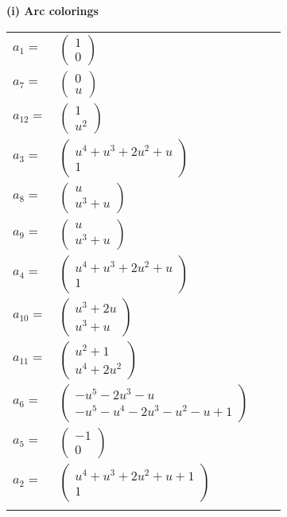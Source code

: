 \documentclass[1p]{elsarticle_modified}
\theoremstyle{definition}
\begin{document}
\flushleft \textbf{(i) Arc colorings}\\
\begin{tabular}{m{7pt} m{180pt} m{7pt} m{180pt} }
\flushright $a_{1}=$&$\begin{pmatrix}1\\0\end{pmatrix}$ \\
\flushright $a_{7}=$&$\begin{pmatrix}0\\u\end{pmatrix}$ \\
\flushright $a_{12}=$&$\begin{pmatrix}1\\u^2\end{pmatrix}$ \\
\flushright $a_{3}=$&$\begin{pmatrix}u^4+u^3+2 u^2+u\\1\end{pmatrix}$ \\
\flushright $a_{8}=$&$\begin{pmatrix}u\\u^3+u\end{pmatrix}$ \\
\flushright $a_{9}=$&$\begin{pmatrix}u\\u^3+u\end{pmatrix}$ \\
\flushright $a_{4}=$&$\begin{pmatrix}u^4+u^3+2 u^2+u\\1\end{pmatrix}$ \\
\flushright $a_{10}=$&$\begin{pmatrix}u^3+2 u\\u^3+u\end{pmatrix}$ \\
\flushright $a_{11}=$&$\begin{pmatrix}u^2+1\\u^4+2 u^2\end{pmatrix}$ \\
\flushright $a_{6}=$&$\begin{pmatrix}- u^5-2 u^3- u\\- u^5- u^4-2 u^3- u^2- u+1\end{pmatrix}$ \\
\flushright $a_{5}=$&$\begin{pmatrix}-1\\0\end{pmatrix}$ \\
\flushright $a_{2}=$&$\begin{pmatrix}u^4+u^3+2 u^2+u+1\\1\end{pmatrix}$\\&\end{tabular}
\end{document}
